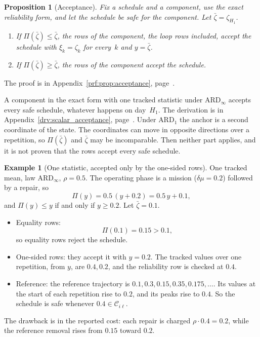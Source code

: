 \documentclass[11pt,a4paper]{article}
\theoremstyle{plain}
\newtheorem{proposition}[theorem]{Proposition}
\theoremstyle{definition}
\newtheorem{example}[theorem]{Example}
\theoremstyle{remark}
\begin{document}
\begin{proposition}[Acceptance]\label{prop:acceptance}
Fix a schedule and a component, use the exact reliability form, and let the schedule be safe for the component.
Let $\bar\zeta = \zeta_{H_1}$.
\begin{enumerate}[label=(\alph*)]
  \item If $\Pi(\bar\zeta) \le \bar\zeta$, the rows of the component, the loop rows included, accept the schedule with $\xi_k = \zeta_k$ for every~$k$ and $y = \bar\zeta$.
  \item If $\Pi(\bar\zeta) \ge \bar\zeta$, the rows of the component accept the schedule.
\end{enumerate}
\end{proposition}
The proof is in Appendix~\ref{prf:prop:acceptance}, page~\pageref{prf:prop:acceptance}.

A component in the exact form with one tracked statistic under $\text{ARD}_\infty$ accepts every safe schedule, whatever happens on day~$H_1$.
The derivation is in Appendix~\ref{drv:scalar_acceptance}, page~\pageref{drv:scalar_acceptance}.
Under $\text{ARD}_1$ the anchor is a second coordinate of the state.
The coordinates can move in opposite directions over a repetition, so $\Pi(\bar\zeta)$ and $\bar\zeta$ may be incomparable.
Then neither part applies, and it is not proven that the rows accept every safe schedule.

\begin{example}[One statistic, accepted only by the one-sided rows]
One tracked mean, law $\text{ARD}_\infty$, $\rho = 0.5$.
The operating phase is a mission ($\delta\mu = 0.2$) followed by a repair, so
\begin{equation}
  \Pi(y) = 0.5\,(y + 0.2) = 0.5\,y + 0.1,
\end{equation}
and $\Pi(y) \le y$ if and only if $y \ge 0.2$.
Let $\bar\zeta = 0.1$.
\begin{itemize}
  \item Equality rows:
    \begin{equation}
      \Pi(0.1) = 0.15 > 0.1,
    \end{equation}
    so equality rows reject the schedule.
  \item One-sided rows: they accept it with $y = 0.2$.
    The tracked values over one repetition, from $y$, are $0.4, 0.2$, and the reliability row is checked at $0.4$.
  \item Reference: the reference trajectory is $0.1, 0.3, 0.15, 0.35, 0.175, \ldots$.
    Its values at the start of each repetition rise to $0.2$, and its peaks rise to $0.4$.
    So the schedule is safe whenever $0.4 \in \mathcal{C}_{i\ell}$.
\end{itemize}
The drawback is in the reported cost: each repair is charged $\rho \cdot 0.4 = 0.2$, while the reference removal rises from $0.15$ toward $0.2$.
\end{example}
\end{document}
